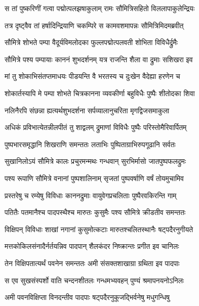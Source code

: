 
\twolineshloka
{स तां पुष्करिणीं गत्वा पद्मोत्पलझषाकुलाम्}
{रामः सौमित्रिसहितो विललापाकुलेन्द्रियः} %

\twolineshloka
{तत्र दृष्ट्वैव तां हर्षादिन्द्रियाणि चकम्पिरे}
{स कामवशमापन्नः सौमित्रिमिदमब्रवीत्} %

\twolineshloka
{सौमित्रे शोभते पम्पा वैदूर्यविमलोदका}
{फुल्लपद्मोत्पलवती शोभिता विविधैर्द्रुमैः} %

\twolineshloka
{सौमित्रे पश्य पम्पायाः काननं शुभदर्शनम्}
{यत्र राजन्ति शैला वा द्रुमाः सशिखरा इव} %

\twolineshloka
{मां तु शोकाभिसंतप्तमाधयः पीडयन्ति वै}
{भरतस्य च दुःखेन वैदेह्या हरणेन च} %

\twolineshloka
{शोकार्तस्यापि मे पम्पा शोभते चित्रकानना}
{व्यवकीर्णा बहुविधैः पुष्पैः शीतोदका शिवा} %

\twolineshloka
{नलिनैरपि संछन्ना ह्यत्यर्थशुभदर्शना}
{सर्पव्यालानुचरिता मृगद्विजसमाकुला} %

\twolineshloka
{अधिकं प्रविभात्येतन्नीलपीतं तु शाद्वलम्}
{द्रुमाणां विविधैः पुष्पैः परिस्तोमैरिवार्पितम्} %

\twolineshloka
{पुष्पभारसमृद्धानि शिखराणि समन्ततः}
{लताभिः पुष्पिताग्राभिरुपगूढानि सर्वतः} %

\twolineshloka
{सुखानिलोऽयं सौमित्रे कालः प्रचुरमन्मथः}
{गन्धवान् सुरभिर्मासो जातपुष्पफलद्रुमः} %

\twolineshloka
{पश्य रूपाणि सौमित्रे वनानां पुष्पशालिनाम्}
{सृजतां पुष्पवर्षाणि वर्षं तोयमुचामिव} %

\twolineshloka
{प्रस्तरेषु च रम्येषु विविधाः काननद्रुमाः}
{वायुवेगप्रचलिताः पुष्पैरवकिरन्ति गाम्} %

\twolineshloka
{पतितैः पतमानैश्च पादपस्थैश्च मारुतः}
{कुसुमैः पश्य सौमित्रे क्रीडतीव समन्ततः} %

\twolineshloka
{विक्षिपन् विविधाः शाखां नगानां कुसुमोत्कटाः}
{मारुतश्चलितस्थानैः षट्पदैरनुगीयते} %

\twolineshloka
{मत्तकोकिलसंनादैर्नर्तयन्निव पादपान्}
{शैलकंदर निष्क्रान्तः प्रगीत इव चानिलः} %

\twolineshloka
{तेन विक्षिपतात्यर्थं पवनेन समन्ततः}
{अमी संसक्तशाखाग्रा ग्रथिता इव पादपाः} %

\twolineshloka
{स एव सुखसंस्पर्शो वाति चन्दनशीतलः}
{गन्धमभ्यवहन् पुण्यं श्रमापनयनोऽनिलः} %

\twolineshloka
{अमी पवनविक्षिप्ता विनदन्तीव पादपाः}
{षट्पदैरनुकूजद्भिर्वनेषु मधुगन्धिषु} %

